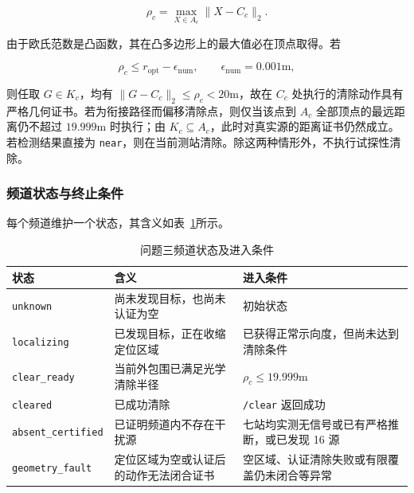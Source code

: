 \begin{equation}
\rho_c=\max_{X\in A_c}\lVert X-C_c\rVert_2.
\label{eq:q3_outer_radius}
\end{equation}

由于欧氏范数是凸函数，其在凸多边形上的最大值必在顶点取得。若

\begin{equation}
\rho_c\le r_{\mathrm{opt}}-\epsilon_{\mathrm{num}},
\qquad
\epsilon_{\mathrm{num}}=0.001\mathrm{m},
\label{eq:q3_clear_certificate}
\end{equation}

则任取 $G\in K_c$，均有 $\lVert G-C_c\rVert_2\le\rho_c<20\mathrm{m}$，故在 $C_c$ 处执行的清除动作具有严格几何证书。若为衔接路径而偏移清除点，则仅当该点到 $A_c$ 全部顶点的最远距离仍不超过 $19.999\mathrm{m}$ 时执行；由 $K_c\subseteq A_c$，此时对真实源的距离证书仍然成立。若检测结果直接为 \texttt{near}，则在当前测站清除。除这两种情形外，不执行试探性清除。

\subsubsection{频道状态与终止条件}

每个频道维护一个状态，其含义如表~\ref{tab:q3_states}所示。

\begin{table}[htbp]
\centering
\small
\setlength{\tabcolsep}{3pt}
\caption{问题三频道状态及进入条件}
\label{tab:q3_states}
\begin{tabularx}{\textwidth}{@{}p{}p{}X@{}}
\toprule
状态 & 含义 & 进入条件 \\
\midrule
\texttt{unknown} & 尚未发现目标，也尚未认证为空 & 初始状态 \\
\texttt{localizing} & 已发现目标，正在收缩定位区域 & 已获得正常示向度，但尚未达到清除条件 \\
\texttt{clear\_ready} & 当前外包围已满足光学清除半径 & $\rho_c\le19.999\mathrm{m}$ \\
\texttt{cleared} & 已成功清除 & \texttt{/clear} 返回成功 \\
\texttt{absent\_certified} & 已证明频道内不存在干扰源 & 七站均实测无信号或已有严格推断，或已发现 16 源 \\
\texttt{geometry\_fault} & 定位区域为空或认证后的动作无法闭合证书 & 空区域、认证清除失败或有限覆盖仍未闭合等异常 \\
\bottomrule
\end{tabularx}
\end{table}

